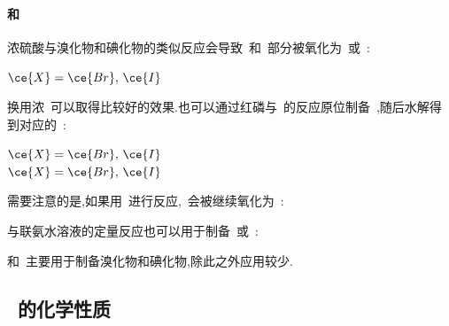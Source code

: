 \documentclass{ctexbook}
\begin{document}
\paragraph{和~}
浓硫酸与溴化物和碘化物的类似反应会导致~和~部分被氧化为~或~:
\begin{tightcenter}
    \quad$\ce{X}=\ce{Br},\,\ce{I}$
\end{tightcenter}
换用浓~可以取得比较好的效果.也可以通过红磷与~的反应原位制备~,随后水解得到对应的~:
\begin{tightcenter}
    \quad$\ce{X}=\ce{Br},\,\ce{I}$\\
    \quad$\ce{X}=\ce{Br},\,\ce{I}$
\end{tightcenter}
需要注意的是,如果用~进行反应,~会被继续氧化为~:
\begin{tightcenter}
\end{tightcenter}
与联氨水溶液的定量反应也可以用于制备~或~:
\begin{tightcenter}
\end{tightcenter}

\indent {}和~主要用于制备溴化物和碘化物,除此之外应用较少.
\subsection{~的化学性质}
\end{document}
